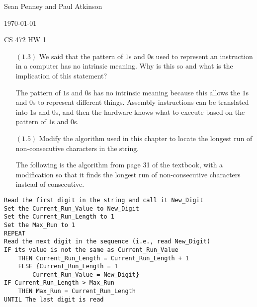 \documentclass[letterpaper,10pt,titlepage]{article}
\def\name{Sean Penney and Paul Atkinson}
\begin{document}
\hfill \name

\hfill \today

\hfill CS 472 HW 1

\begin{enumerate}
\item[$(1.3)$] We said that the pattern of $1$s and $0$s used to represent an instruction
  in a computer has no intrinsic meaning. Why is this so and what is the implication of
  this statement?

  The pattern of $1$s and $0$s has no intrinsic meaning because this allows the $1$s and $0$s
  to represent different things.  Assembly instructions can be translated into $1$s and $0$s,
  and then the hardware knows what to execute based on the pattern of $1$s and $0$s.
  
\item[$(1.5)$] Modify the algorithm used in this chapter to locate the longest run of
  non-consecutive characters in the string.
  
  The following is the algorithm from page 31 of the textbook, with a modification so that
  it finds the longest run of non-consecutive characters instead of consecutive.
  
\end{enumerate}
\begin{lstlisting}
Read the first digit in the string and call it New_Digit
Set the Current_Run_Value to New_Digit
Set the Current_Run_Length to 1
Set the Max_Run to 1
REPEAT
Read the next digit in the sequence (i.e., read New_Digit)
IF its value is not the same as Current_Run_Value
	THEN Current_Run_Length = Current_Run_Length + 1
	ELSE {Current_Run_Length = 1
		Current_Run_Value = New_Digit}
IF Current_Run_Length > Max_Run
	THEN Max_Run = Current_Run_Length
UNTIL The last digit is read

\end{lstlisting}
\end{document}
